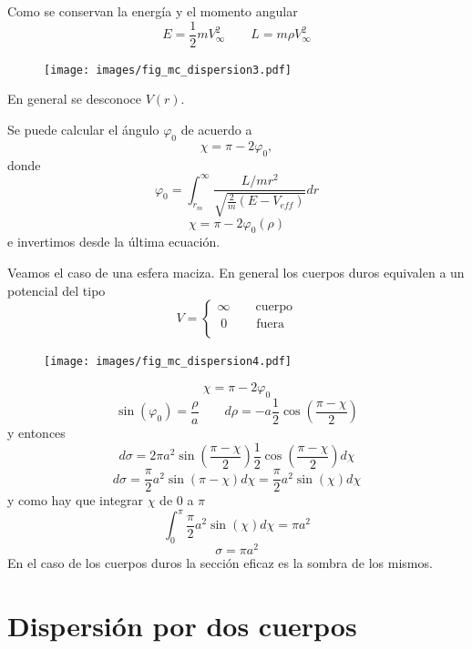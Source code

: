 \documentclass[10pt,oneside]{CBFT_book}
\begin{document}
Como se conservan la energía y el momento angular
\[
	E = \frac{1}{2} m V_\infty^2 \qquad L = m \rho V_\infty^2 
\]
\begin{figure}[htb]
	\begin{center}
	\texttt{[image: images/fig\_mc\_dispersion3.pdf]}	 
	\end{center}
	\caption{}
\end{figure}
En general se desconoce $V(r)$.

Se puede calcular el ángulo $\varphi_0$ de acuerdo a 
\[
	\chi = \pi - 2\varphi_0,
\]
donde
\[
	\varphi_0 = \int_{r_m}^{\infty} \frac{L/mr^2}{\sqrt{\frac{2}{m}(E - V_{eff})}} dr
\]
\[
	\chi = \pi - 2 \varphi_0 (\rho)
\]
e invertimos desde la última ecuación.

Veamos el caso de una esfera maciza. En general los cuerpos duros equivalen a un potencial del tipo
\[
	V = \begin{cases}
	     \infty \qquad \textrm{cuerpo}\\
	     \;0 \qquad \; \textrm{fuera} \\
	    \end{cases}
\]
\begin{figure}[htb]
	\begin{center}
	\texttt{[image: images/fig\_mc\_dispersion4.pdf]}	 
	\end{center}
	\caption{}
\end{figure}
\[
	\chi = \pi - 2\varphi_0
\]
\[
	\sin(\varphi_0) = \frac{\rho}{a} \qquad d\rho = -a \frac{1}{2}\cos \left(\frac{\pi-\chi}{2}\right)
\]
y entonces 
\[
	d\sigma = 2\pi a^2 \sin\left(\frac{\pi-\chi}{2}\right) \frac{1}{2}\cos\left(\frac{\pi-\chi}{2}\right) d\chi
\]
\[
	d\sigma = \frac{\pi}{2} a^2 \sin( \pi-\chi) d\chi = \frac{\pi}{2} a^2 \sin( \chi) d\chi
\]
y como hay que integrar $\chi$ de 0 a $\pi$
\[
	\int_0^\pi \frac{\pi}{2} a^2 \sin( \chi) d\chi = \pi a^2
\]
\[
	\sigma = \pi a^2
\]
En el caso de los cuerpos duros la sección eficaz es la sombra de los mismos.


\section{Dispersión por dos cuerpos}
\end{document}
